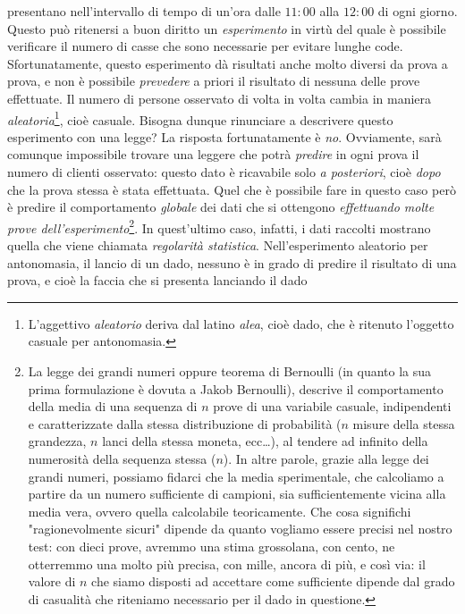 \documentclass[12pt,oneside,openany]{memoir}
\numberwithin{equation}{subsection}
\begin{document}
presentano nell'intervallo di tempo di un'ora dalle $11:00$ alla $12:00$ di ogni
giorno. Questo pu\`o ritenersi a buon diritto un \textit{esperimento} in virt\`u
del quale \`e possibile verificare il numero di casse che sono necessarie per
evitare lunghe code. Sfortunatamente, questo esperimento d\`a risultati anche
molto diversi da prova a prova, e non \`e possibile \textit{prevedere} a priori
il risultato di nessuna delle prove effettuate. Il numero di persone osservato
di volta in volta cambia in maniera \textit{aleatoria}\footnote{L'aggettivo
\textit{aleatorio} deriva dal latino \textit{alea}, cio\`e dado, che \`e
ritenuto l'oggetto casuale per antonomasia.}, cio\`e casuale. Bisogna dunque
rinunciare a descrivere questo esperimento con una legge? La risposta
fortunatamente \`e \textit{no}. Ovviamente, sar\`a comunque impossibile trovare
una leggere che potr\`a \textit{predire} in ogni prova il numero di clienti
osservato: questo dato \`e ricavabile solo \textit{a posteriori}, cio\`e
\textit{dopo} che la prova stessa \`e stata effettuata. Quel che \`e possibile
fare in questo caso per\`o \`e predire il comportamento \textit{globale} dei
dati che si ottengono \textit{effettuando molte prove
dell'esperimento}\footnote{La legge dei grandi numeri oppure teorema di
Bernoulli (in quanto la sua prima formulazione \`e dovuta a Jakob Bernoulli),
descrive il comportamento della media di una sequenza di $n$ prove di una
variabile casuale, indipendenti e caratterizzate dalla stessa distribuzione di
probabilit\`a ($n$ misure della stessa grandezza, $n$ lanci della stessa moneta,
ecc\dots), al tendere ad infinito della numerosit\`a della sequenza stessa
($n$). In altre parole, grazie alla legge dei grandi numeri, possiamo fidarci
che la media sperimentale, che calcoliamo a partire da un numero sufficiente di
campioni, sia sufficientemente vicina alla media vera, ovvero quella calcolabile
teoricamente. Che cosa significhi "ragionevolmente sicuri" dipende da quanto
vogliamo essere precisi nel nostro test: con dieci prove, avremmo una stima
grossolana, con cento, ne otterremmo una molto pi\`u precisa, con mille, ancora
di pi\`u, e così via: il valore di $n$ che siamo disposti ad accettare come
sufficiente dipende dal grado di casualit\`a che riteniamo necessario per il
dado in questione.}. In quest'ultimo caso, infatti, i dati raccolti mostrano
quella che viene chiamata \textit{regolarit\`a statistica}. Nell'esperimento
aleatorio per antonomasia, il lancio di un dado, nessuno \`e in grado di predire
il risultato di una prova, e cio\`e la faccia che si presenta lanciando il dado
\end{document}
